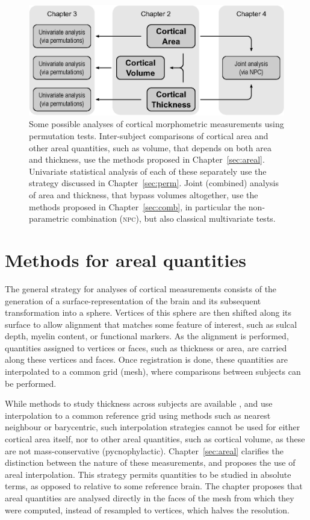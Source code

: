 \begin{figure}[tbp]
\begin{center}
\centerline{\includegraphics{images/flow.eps}}
\end{center}
\caption[Some possible analyses of cortical morphometric measurements using permutation tests.]{Some possible analyses of cortical morphometric measurements using permutation tests. Inter-subject comparisons of cortical area and other areal quantities, such as volume, that depends on both area and thickness, use the methods proposed in Chapter~\ref{sec:areal}. Univariate statistical analysis of each of these separately use the strategy discussed in Chapter~\ref{sec:perm}. Joint (combined) analysis of area and thickness, that bypass volumes altogether, use the methods proposed in Chapter~\ref{sec:comb}, in particular the non-parametric combination (\textsc{npc}), but also classical multivariate tests.}
\label{fig:intro:flow}
\end{figure}

\section{Methods for areal quantities}

The general strategy for analyses of cortical measurements consists of the generation of a surface-representation of the brain and its subsequent transformation into a sphere. Vertices of this sphere are then shifted along its surface to allow alignment that matches some feature of interest, such as sulcal depth, myelin content, or functional markers. As the alignment is performed, quantities assigned to vertices or faces, such as thickness or area, are carried along these vertices and faces. Once registration is done, these quantities are interpolated to a common grid (mesh), where comparisons between subjects can be performed.  

While methods to study thickness across subjects are available \citep{Fischl2000}, and use interpolation to a common reference grid using methods such as nearest neighbour or barycentric, such interpolation strategies cannot be used for either cortical area itself, nor to other areal quantities, such as cortical volume, as these are not mass-conservative (pycnophylactic). Chapter~\ref{sec:areal} clarifies the distinction between the nature of these measurements, and proposes the use of areal interpolation. This strategy permits quantities to be studied in absolute terms, as opposed to relative to some reference brain. The chapter proposes that areal quantities are analysed directly in the faces of the mesh from which they were computed, instead of resampled to vertices, which halves the resolution.

